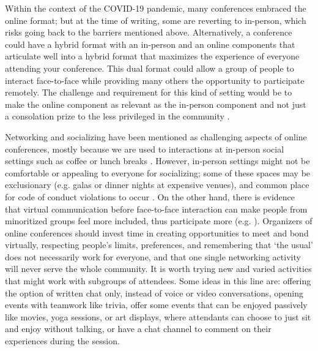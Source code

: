 \documentclass[10pt,letterpaper]{article}
\begin{document}
Within the context of the COVID-19 pandemic, many conferences embraced the online format; but at the time of writing, some are reverting to in-person, which risks going back to the barriers mentioned above.
Alternatively, a conference could have a hybrid format with an in-person and an online components that articulate well into a hybrid format that maximizes the experience of everyone attending your conference. This dual format could allow a group of people to interact face-to-face while providing many others the opportunity to participate remotely. 
The challenge and requirement for this kind of setting would be to make the online component as relevant as the in-person component and not just a consolation prize to the less privileged in the community \cite{ninerBetterWhomLeveling2021}.

Networking and socializing have been mentioned as challenging aspects of online conferences, mostly because we are used to interactions at in-person social settings such as coffee or lunch breaks \cite{salibaGettingGripsOnline2020, roosOnlineConferencesNew2020}. 
However, in-person settings might not be comfortable or appealing to everyone for socializing; 
some of these spaces may be exclusionary (e.g. galas or dinner nights at expensive venues), and common place for code of conduct violations to occur \cite{auroraHowRespondCode2019}. 
On the other hand, there is evidence that virtual communication before face-to-face interaction can make people from minoritized groups feel more included, thus participate more (e.g. \cite{trianaDoesOrderFacetoFace2012, blackEngenderingBelongingThoughtful2020}). 
Organizers of online conferences should invest time in creating opportunities to meet and bond virtually, respecting people's limits, preferences, and remembering that `the usual' does not necessarily work for everyone, and that one single networking activity will never serve the whole community. 
It is worth trying new and varied activities that might work with subgroups of attendees.
Some ideas in this line are: offering the option of written chat only, instead of voice or video conversations, opening events with teamwork like trivia, offer some events that can be enjoyed passively like movies, yoga sessions, or art displays, where attendants can choose to just sit and enjoy without talking, or have a chat channel to comment on their experiences during the session.
\end{document}
